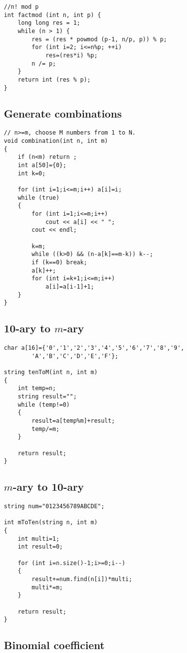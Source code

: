 \documentclass[a4paper]{article}
\begin{document}
\begin{verbatim}
//n! mod p
int factmod (int n, int p) {
	long long res = 1;
	while (n > 1) {
		res = (res * powmod (p-1, n/p, p)) % p;
		for (int i=2; i<=n%p; ++i)
			res=(res*i) %p;
		n /= p;
	}
	return int (res % p);
}
\end{verbatim}

\subsection{Generate combinations}
\begin{verbatim}
// n>=m, choose M numbers from 1 to N.
void combination(int n, int m)
{
	if (n<m) return ;
	int a[50]={0};
	int k=0;

	for (int i=1;i<=m;i++) a[i]=i;
	while (true)
	{
		for (int i=1;i<=m;i++)
			cout << a[i] << " ";
		cout << endl;

		k=m;
		while ((k>0) && (n-a[k]==m-k)) k--;
		if (k==0) break;
		a[k]++;
		for (int i=k+1;i<=m;i++)
			a[i]=a[i-1]+1;
	}
}
\end{verbatim}

\subsection{10-ary to $m$-ary}
\begin{verbatim}
char a[16]={'0','1','2','3','4','5','6','7','8','9',
		'A','B','C','D','E','F'};

string tenToM(int n, int m)
{
	int temp=n;
	string result="";
	while (temp!=0)
	{
		result=a[temp%m]+result;
		temp/=m;
	}

	return result;
}
\end{verbatim}

\subsection{$m$-ary to 10-ary}

\begin{verbatim}
string num="0123456789ABCDE";

int mToTen(string n, int m)
{
	int multi=1;
	int result=0;

	for (int i=n.size()-1;i>=0;i--)
	{
		result+=num.find(n[i])*multi;
		multi*=m;
	}

	return result;
}
\end{verbatim}

\subsection{Binomial coefficient}
\end{document}
